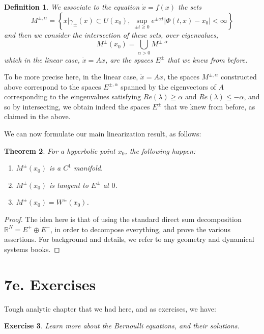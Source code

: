 \documentclass[12pt]{amsbook}
\newtheorem{theorem}{Theorem}[chapter]
\newtheorem{definition}[theorem]{Definition}
\newtheorem{exercise}[theorem]{Exercise}
\begin{document}
\begin{definition}
We associate to the equation $\dot{x}=f(x)$ the sets
$$M^{\pm,\alpha}=\left\{x\Big|\gamma_\pm(x)\subset U(x_0),\ \sup_{\pm t\geq0}e^{\pm\alpha t}|\Phi(t,x)-x_0|<\infty\right\}$$
and then we consider the intersection of these sets, over eigenvalues,
$$M^\pm(x_0)=\bigcup_{\alpha>0}M^{\pm,\alpha}$$
which in the linear case, $\dot{x}=Ax$, are the spaces $E^\pm$ that we knew from before.
\end{definition}

To be more precise here, in the linear case, $\dot{x}=Ax$, the spaces $M^{\pm,\alpha}$ constructed above correspond to the spaces $E^{\pm,\alpha}$ spanned by the eigenvectors of $A$ corresponding to the eingenvalues satisfying $Re(\lambda)\geq\alpha$ and $Re(\lambda)\leq-\alpha$, and so by intersecting, we obtain indeed the spaces $E^\pm$ that we knew from before, as claimed in the above.

\bigskip

We can now formulate our main linearization result, as follows:

\begin{theorem}
For a hyperbolic point $x_0$, the following happen:
\begin{enumerate}
\item $M^\pm(x_0)$ is a $C^1$ manifold.

\item $M^\pm(x_0)$ is tangent to $E^\pm$ at $0$.

\item $M^\pm(x_0)=W^\pm(x_0)$.
\end{enumerate}
\end{theorem}

\begin{proof}
The idea here is that of using the standard direct sum decomposition $\mathbb R^N=E^+\oplus E^-$, in order to decompose everything, and prove the various assertions. For background and details, we refer to any geometry and dynamical systems books.
\end{proof}

\section*{7e. Exercises}

Tough analytic chapter that we had here, and as exercises, we have:

\begin{exercise}
Learn more about the Bernoulli equations, and their solutions.
\end{exercise}
\end{document}
